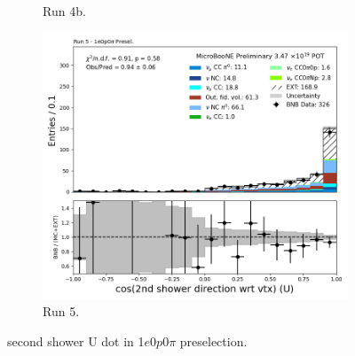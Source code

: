 \begin{figure}[H]
\begin{subfigure}[t]{0.32\linewidth}
        \caption{Run 4b.}
    \end{subfigure}%
    \hspace{0.2cm}%
    \begin{subfigure}[t]{0.32\linewidth}
        \includegraphics[width=\linewidth]{technote/Appendix_Preselection/Figures/1e0p0pi/Run5/secondshower_U_dot_Run5_1e0p0pi_Presel.png}
        \caption{Run 5.}
    \end{subfigure}
    \caption{second shower U dot in 1$e$0$p$0$\pi$ preselection.}
\end{figure}

